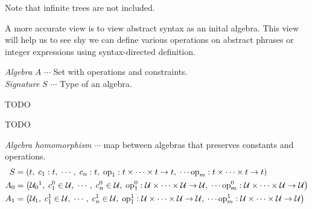 \begin{enumcirc}
\begin{center}
    \end{center}

    Note that infinite trees are not included.

  \item
    A more accurate view is to view abstract syntax as an inital algebra. This
    view will help us to see shy we can define various operations on abstract
    phrases or integer expressions using syntax-directed definition.

  \item
    \emph{Algebra} $A$ $\cdots$ Set with operations and constraints. \\
    \emph{Signature} $S$ $\cdots$ Type of an algebra.

    \begin{exampletab}
      \begin{enumrm}
        \item TODO
        \item TODO
      \end{enumrm}
    \end{exampletab}

  \item
    \emph{Algebra homomorphism} $\cdots$ map between algebras that
    preserves constants and operations.
    \begin{align*}
      S &= \prths{
      t,\; c_1 : t,\; \cdots ,\; c_n : t ,\;
      \textrm{op}_1 : t \times \cdots \times t \rightarrow t ,\; \cdots
      \textrm{op}_m : t \times \cdots \times t \rightarrow t
      }
      \\
      A_0 &= \prths{
      \mathcal{U}_0\footnotemark,\;
      c_1^0 \in \mathcal{U} ,\;
      \cdots ,\;
      c_n^0 \in \mathcal{U} ,\;
      \textrm{op}_1^0 :
      \mathcal{U} \times \cdots \times \mathcal{U} \rightarrow \mathcal{U},\; \cdots
      \textrm{op}_m^0 :
      \mathcal{U} \times \cdots \times \mathcal{U} \rightarrow \mathcal{U}
      }
      \\
      A_1 &= \prths{
      \mathcal{U}_1,\;
      c_1^1 \in \mathcal{U} ,\;
      \cdots ,\;
      c_n^1 \in \mathcal{U} ,\;
      \textrm{op}_1^1 :
      \mathcal{U} \times \cdots \times \mathcal{U} \rightarrow \mathcal{U},\; \cdots
      \textrm{op}_m^1 :
      \mathcal{U} \times \cdots \times \mathcal{U} \rightarrow \mathcal{U}
      }
    \end{align*}


\end{enumcirc}
